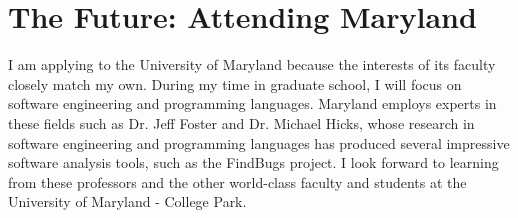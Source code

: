 \section*{The Future: Attending Maryland}
I am applying to the University of Maryland because the interests of its faculty closely match my own. During my time in graduate school, I will focus on software engineering and programming languages. Maryland employs experts in these fields such as Dr. Jeff Foster and Dr. Michael Hicks, whose research in software engineering and programming languages has produced several impressive software analysis tools, such as the FindBugs project. I look forward to learning from these professors and the other world-class faculty and students at the University of Maryland - College Park.
